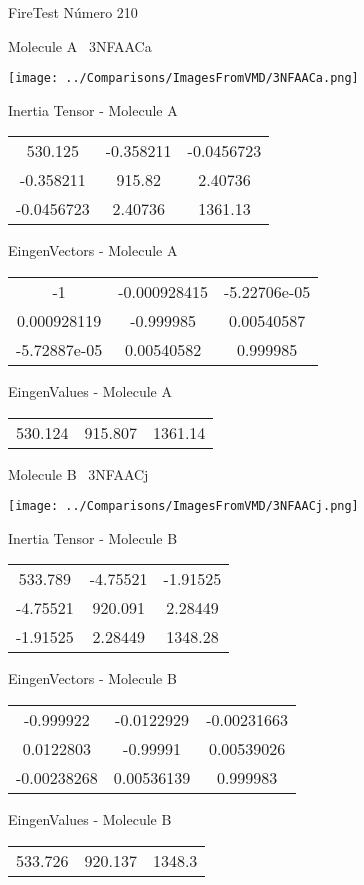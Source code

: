\vtab[-3cm]
\begin{center}
{\large FireTest \tab Número 210}
\end{center}
\begin{multicols}{2}
\begin{center}

Molecule A \
3NFAACa

\texttt{[image: ../Comparisons/ImagesFromVMD/3NFAACa.png]}

Inertia Tensor - Molecule A \\
\begin{tabular}{|c c c|}
530.125	 & 	-0.358211	 & 	-0.0456723	 \\
-0.358211	 & 	915.82	 & 	2.40736	 \\
-0.0456723	 & 	2.40736	 & 	1361.13
\end{tabular}

\vtab
 EingenVectors - Molecule A     \\
\begin{tabular}{|c c c|}
-1	 & 	-0.000928415	 & 	-5.22706e-05	 \\
0.000928119	 & 	-0.999985	 & 	0.00540587	 \\
-5.72887e-05	 & 	0.00540582	 & 	0.999985
\end{tabular}

\vtab
 EingenValues - Molecule A     \\
\begin{tabular}{|c c c|}
530.124	 & 	915.807	 & 	1361.14	 \\
\end{tabular}
\columnbreak

Molecule B \
3NFAACj

\texttt{[image: ../Comparisons/ImagesFromVMD/3NFAACj.png]}

Inertia Tensor - Molecule B \\
\begin{tabular}{|c c c|}
533.789	 & 	-4.75521	 & 	-1.91525	 \\
-4.75521	 & 	920.091	 & 	2.28449	 \\
-1.91525	 & 	2.28449	 & 	1348.28
\end{tabular}

\vtab
 EingenVectors - Molecule B     \\
\begin{tabular}{|c c c|}
-0.999922	 & 	-0.0122929	 & 	-0.00231663	 \\
0.0122803	 & 	-0.99991	 & 	0.00539026	 \\
-0.00238268	 & 	0.00536139	 & 	0.999983
\end{tabular}

\vtab
 EingenValues - Molecule B     \\
\begin{tabular}{|c c c|}
533.726	 & 	920.137	 & 	1348.3	 \\
\end{tabular}

\end{center}
\end{multicols}

